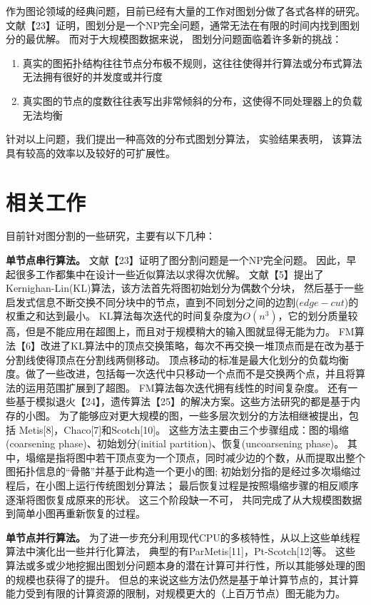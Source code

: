 \documentclass[master]{njuthesis}
\begin{document}
作为图论领域的经典问题，目前已经有大量的工作对图划分做了各式各样的研究。 
文献【23】证明，图划分是一个NP完全问题，通常无法在有限的时间内找到图划分的最优解。
而对于大规模图数据来说， 图划分问题面临着许多新的挑战：
\begin{enumerate}
 \item 真实的图拓扑结构往往节点分布极不规则，这往往使得并行算法或分布式算法无法拥有很好的并发度或并行度
 \item 真实图的节点的度数往往表写出非常倾斜的分布，这使得不同处理器上的负载无法均衡
\end{enumerate}
针对以上问题，我们提出一种高效的分布式图划分算法， 实验结果表明， 该算法具有较高的效率以及较好的可扩展性。

\section{相关工作}
目前针对图分割的一些研究，主要有以下几种：

\textbf{单节点串行算法。 } 文献【23】证明了图分割问题是一个NP完全问题。 
因此，早起很多工作都集中在设计一些近似算法以求得次优解。
文献【5】提出了Kernighan-Lin(KL)算法，该方法首先将图初始划分为偶数个分块，
然后基于一些启发式信息不断交换不同分块中的节点，直到不同划分之间的边割($edge-cut$)的权重之和达到最小。
KL算法每次迭代的时间复杂度为$O(n^3)$，它的划分质量较高，但是不能应用在超图上，而且对于规模稍大的输入图就显得无能为力。
FM算法【6】改进了KL算法中的顶点交换策略，每次不再交换一堆顶点而是在改为基于分割线使得顶点在分割线两侧移动。
顶点移动的标准是最大化划分的负载均衡度。做了一些改进，包括每一次迭代中只移动一个点而不是交换两个点，并且将算法的运用范围扩展到了超图。
FM算法每次迭代拥有线性的时间复杂度。
还有一些基于模拟退火【24】，遗传算法【25】的解决方案。这些方法研究的都是基于内存的小图。
为了能够应对更大规模的图，一些多层次划分的方法相继被提出，包括 Metis[8]，Chaco[7]和Scotch[10]。
这些方法主要由三个步骤组成：图的塌缩(coarsening phase)、初始划分(initial partition)、恢复(uncoarsening phase)。
其中，塌缩是指将图中若干顶点变为一个顶点，同时减少边的个数，从而提取出整个图拓扑信息的“骨骼”并基于此构造一个更小的图; 
初始划分指的是经过多次塌缩过程后，在小图上运行传统图划分算法；
最后恢复过程是按照塌缩步骤的相反顺序逐渐将图恢复成原来的形状。
这三个阶段缺一不可， 共同完成了从大规模图数据到简单小图再重新恢复的过程。

\textbf{单节点并行算法。 } 为了进一步充分利用现代CPU的多核特性，从以上这些单线程算法中演化出一些并行化算法，
典型的有ParMetis[11]，Pt-Scotch[12]等。 
这些算法或多或少地挖掘出图划分问题本身的潜在计算可并行性，所以其能够处理的图的规模也获得了的提升。 
但总的来说这些方法仍然是基于单计算节点的，其计算能力受到有限的计算资源的限制，对规模更大的（上百万节点）图无能为力。
\end{document}
